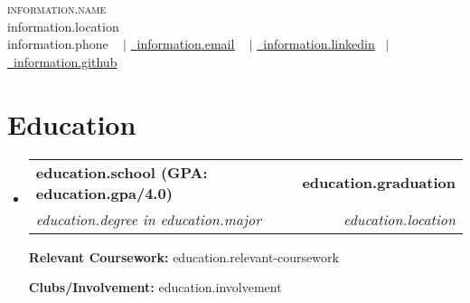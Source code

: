 \documentclass[letterpaper,11pt]{article}
\makeatletter
\newcommand{\resumeSubheading}[4]{
  \vspace{-2pt}\item
    \begin{tabular*}{1.0\textwidth}[t]{l@{\extracolsep{\fill}}r}
      \textbf{#1} & \textbf{\small #2} \\
      \textit{\small#3} & \textit{\small #4} \\
    \end{tabular*}\vspace{-7pt}
}
\newcommand{\resumeSubHeadingListStart}{\begin{itemize}[leftmargin=0.0in, label={}]}
\newcommand{\resumeSubHeadingListEnd}{\end{itemize}}
\makeatother
\begin{document}


\begin{center}
    {\Huge \scshape  {{information.name}}  } \\ \vspace{1pt}
                \vspace{-1pt}
    {{information.location}} \\ \vspace{0pt}
            \vspace{0pt}
    \small \raisebox{-0.1\height} {{information.phone}} ~ $\vert$ \href{mailto:{{information.email}}}{\raisebox{-0.2\height}\ \underline{{{information.email}}}} ~ $\vert$
        \vspace{4pt}
    \href{https://{{information.linkedin}}}{\raisebox{-0.2\height}\ \underline{{{information.linkedin}}}}  ~$\vert$
    \href{https://{{information.github}}}{\raisebox{-0.2\height}\ \underline{{{information.github}}}}

    \vspace{-14pt}
\end{center}


\section{Education}
  \resumeSubHeadingListStart
    \resumeSubheading
      {{{education.school}} (GPA: {{education.gpa}}/4.0)}{{{education.graduation}}}
      {{{education.degree}} in {{education.major}}}{{{education.location}}}
          \vspace{-2pt}

    {\textbf{Relevant Coursework:}  {{education.relevant-coursework}}}
          \vspace{-2pt}

    {\textbf{Clubs/Involvement:} {{education.involvement}}}

  \resumeSubHeadingListEnd

\end{document}

